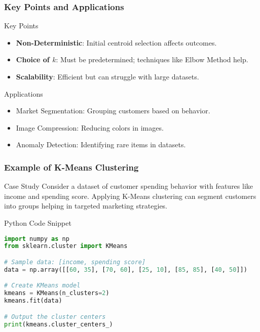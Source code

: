 \documentclass[aspectratio=169]{beamer}
\begin{document}
\begin{frame}[fragile]
    \frametitle{Key Points and Applications}
    \begin{block}{Key Points}
        \begin{itemize}
            \item \textbf{Non-Deterministic}: Initial centroid selection affects outcomes.
            \item \textbf{Choice of $k$}: Must be predetermined; techniques like Elbow Method help.
            \item \textbf{Scalability}: Efficient but can struggle with large datasets.
        \end{itemize}
    \end{block}

    \begin{block}{Applications}
        \begin{itemize}
            \item Market Segmentation: Grouping customers based on behavior.
            \item Image Compression: Reducing colors in images.
            \item Anomaly Detection: Identifying rare items in datasets.
        \end{itemize}
    \end{block}
\end{frame}

\begin{frame}[fragile]
    \frametitle{Example of K-Means Clustering}
    \begin{block}{Case Study}
        Consider a dataset of customer spending behavior with features like income and spending score. 
        Applying K-Means clustering can segment customers into groups helping in targeted marketing strategies.
    \end{block}

    \begin{block}{Python Code Snippet}
        \begin{lstlisting}[language=Python]
import numpy as np
from sklearn.cluster import KMeans

# Sample data: [income, spending score]
data = np.array([[60, 35], [70, 60], [25, 10], [85, 85], [40, 50]])

# Create KMeans model
kmeans = KMeans(n_clusters=2)
kmeans.fit(data)

# Output the cluster centers
print(kmeans.cluster_centers_)
        \end{lstlisting}
    \end{block}
\end{frame}
\end{document}
